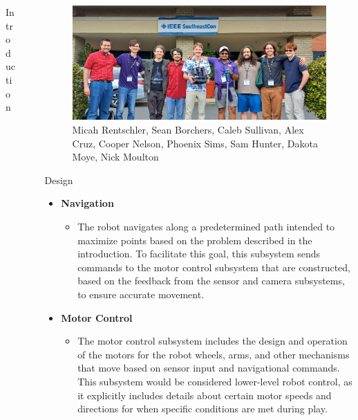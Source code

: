 \documentclass[final]{beamer}
\newlength{\sepwidth}
\newlength{\colwidth}
\newcommand{\separatorcolumn}{\begin{column}{\sepwidth}\end{column}}
\begin{document}
\begin{frame}[t]
\begin{columns}[t]
\begin{column}{\colwidth}
\begin{block}{Introduction}
  \end{block}
 

\end{column}

\separatorcolumn

\begin{column}{\colwidth}

    \begin{figure}
      \centering
      \includegraphics[width=30.0cm]{Team Picture SECON 2025.jpg}
      \caption{Micah Rentschler, Sean Borchers, Caleb Sullivan, Alex Cruz, Cooper Nelson, Phoenix Sims, Sam Hunter, Dakota Moye, Nick Moulton}
    \end{figure}

    \begin{block}{Design}
    \begin{itemize}
    
      \item \textbf{Navigation}
        \begin{itemize}
          \item The robot navigates along a predetermined path intended to maximize points based on the problem described in the introduction. To facilitate this goal, this subsystem sends commands to the motor control subsystem that are constructed, based on the feedback from the sensor and camera subsystems, to ensure accurate movement.
        \end{itemize}
        
      \item \textbf{Motor Control}
        \begin{itemize}
          \item The motor control subsystem includes the design and operation of the motors for the robot wheels, arms, and other mechanisms that move based on sensor input and navigational commands. This subsystem would be considered lower-level robot control, as it explicitly includes details about certain motor speeds and directions for when specific conditions are met during play.
        \end{itemize}
      

\end{itemize}
\end{block}
\end{column}
\end{columns}
\end{frame}
\end{document}
